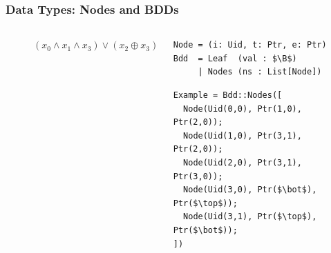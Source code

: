 \documentclass[english, aspectratio=169]{beamer}
\newcommand{\B}[0]{\ensuremath{\mathbb{B}}}
\begin{document}
\begin{frame}[t, fragile]
  \frametitle{Data Types: Nodes and BDDs}

  \begin{columns}
    \begin{column}[t]{0.4\linewidth}
      \begin{figure}
        \centering

        \begin{tikzpicture}[every node/.style={transform shape}]
          
        \end{tikzpicture}

        \caption{$(x_0 \wedge x_1 \wedge x_3) \vee (x_2 \oplus x_3)$}
      \end{figure}
    \end{column}
    \begin{column}[t]{0.6\linewidth}
      \begin{lstlisting}
Node = (i: Uid, t: Ptr, e: Ptr)
Bdd  = Leaf  (val : $\B$)
     | Nodes (ns : List[Node])
      \end{lstlisting}

      \begin{lstlisting}[firstnumber=4]
Example = Bdd::Nodes([
  Node(Uid(0,0), Ptr(1,0), Ptr(2,0));
  Node(Uid(1,0), Ptr(3,1), Ptr(2,0));
  Node(Uid(2,0), Ptr(3,1), Ptr(3,0));
  Node(Uid(3,0), Ptr($\bot$), Ptr($\top$));
  Node(Uid(3,1), Ptr($\top$), Ptr($\bot$));
])
      \end{lstlisting}
    \end{column}
  \end{columns}
\end{frame}
\end{document}
